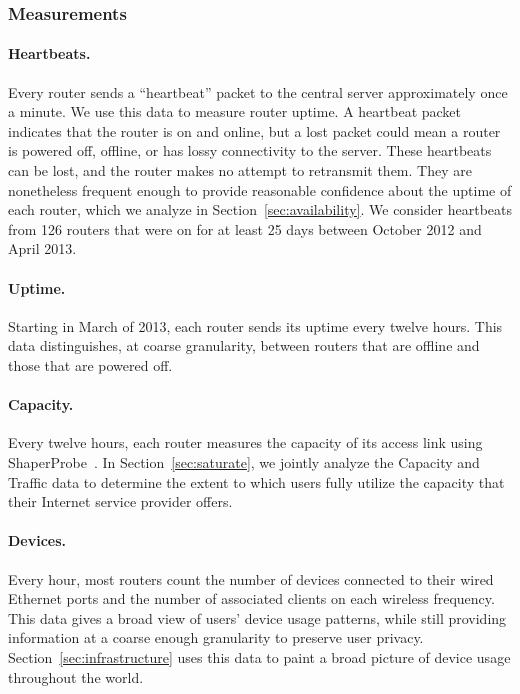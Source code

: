 
\subsubsection{Measurements}

\paragraph{Heartbeats.} Every router sends a ``heartbeat'' packet to the central
\name{} server approximately once a minute. We use this data to measure router
uptime. A heartbeat packet indicates that the router is on and online,
but a lost packet could mean a router is powered off, offline, or has
lossy connectivity to the server.  These heartbeats can be lost, and the
router makes no attempt to retransmit them. They are
nonetheless frequent enough to provide reasonable confidence
about the uptime of each \name{} router, which we analyze in
Section~\ref{sec:availability}. We consider heartbeats from 126 routers
that were on for at least 25 days between October 2012 and April 2013.

\paragraph{Uptime.} Starting in March of 2013, each router sends its uptime
every twelve hours. This data distinguishes, at coarse granularity, between
routers that are offline and those that are powered off.

\paragraph{Capacity.} Every twelve hours, each router measures the capacity of
its access link using ShaperProbe~\cite{www-shaperprobe}. In
Section~\ref{sec:saturate}, we jointly analyze the Capacity and
Traffic data to determine the extent to which users fully utilize
the capacity that their Internet service provider offers.

\paragraph{Devices.} Every hour, most routers count the number of devices
connected to their wired Ethernet ports and the number of associated clients on
each wireless frequency. This data gives a broad view of users' device usage
patterns, while still providing information at a coarse enough granularity to
preserve user privacy. Section~\ref{sec:infrastructure} uses this data to paint
a broad picture of device usage throughout the world.

